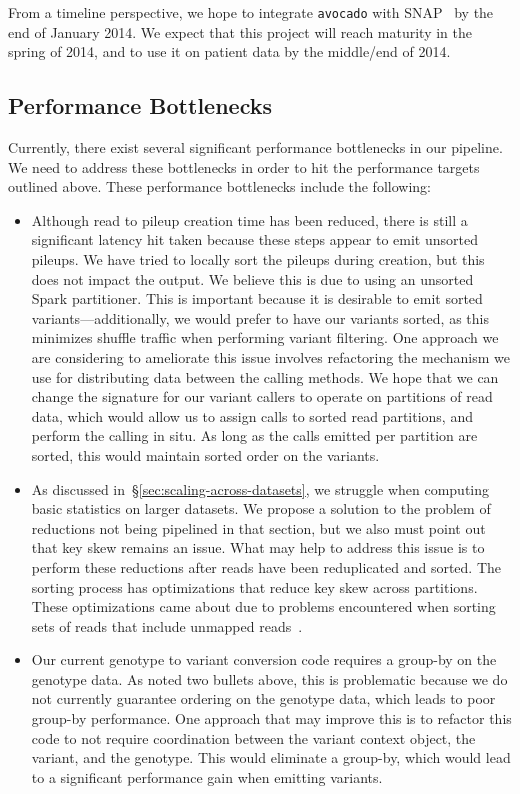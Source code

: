 \documentclass{acm_proc_article-sp}
\begin{document}
From a timeline perspective, we hope to integrate \texttt{avocado} with SNAP~\cite{zaharia11} by the end of January 2014.
We expect that this project will reach maturity in the spring of 2014, and to use it on patient data by the middle/end of 2014.

\subsection{Performance Bottlenecks}
\label{sec:performance-bottlenecks}

Currently, there exist several significant performance bottlenecks in our pipeline. We need to address these bottlenecks
in order to hit the performance targets outlined above. These performance bottlenecks include the following:

\begin{itemize}
\item Although read to pileup creation time has been reduced, there is still a significant latency hit taken because these steps
appear to emit unsorted pileups. We have tried to locally sort the pileups during creation, but this does not impact the output. We
believe this is due to using an unsorted Spark partitioner. This is important because it is desirable to emit sorted variants---additionally,
we would prefer to have our variants sorted, as this minimizes shuffle traffic when performing variant filtering. One approach we are
considering to ameliorate this issue involves refactoring the mechanism we use for distributing data between the calling methods.
We hope that we can change the signature for our variant callers to operate on partitions of read data, which would allow us to 
assign calls to sorted read partitions, and perform the calling in situ. As long as the calls emitted per partition are sorted, this would
maintain sorted order on the variants.
\item As discussed in~\S\ref{sec:scaling-across-datasets}, we struggle when computing basic statistics on larger datasets. We propose
a solution to the problem of reductions not being pipelined in that section, but we also must point out that key skew remains an issue.
What may help to address this issue is to perform these reductions after reads have been reduplicated and sorted. The sorting process
has optimizations that reduce key skew across partitions. These optimizations came about due to problems encountered when sorting
sets of reads that include unmapped reads~\cite{massie13}.
\item Our current genotype to variant conversion code requires a group-by on the genotype data. As noted two bullets above, this is
problematic because we do not currently guarantee ordering on the genotype data, which leads to poor group-by performance. One
approach that may improve this is to refactor this code to not require coordination between the variant context object, the variant,
and the genotype. This would eliminate a group-by, which would lead to a significant performance gain when emitting variants.
\end{itemize}
\end{document}
